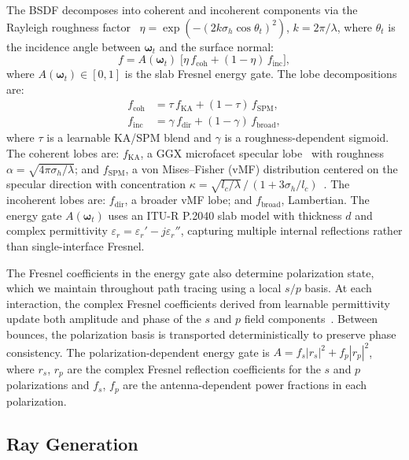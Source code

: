 The BSDF decomposes into coherent and incoherent components via the Rayleigh roughness factor~\cite{beckmann1963scattering} $\eta = \exp(-(2k\sigma_h\cos\theta_t)^2)$, $k=2\pi/\lambda$, where $\theta_t$ is the incidence angle between $\boldsymbol{\omega}_t$ and the surface normal:
\begin{equation}
    f = A(\boldsymbol{\omega}_t)\;\Big[\eta\,f_\mathrm{coh} + (1-\eta)\,f_\mathrm{inc}\Big],
    \label{eq:bsdf_full}
\end{equation}
where $A(\boldsymbol{\omega}_t) \in [0,1]$ is the slab Fresnel energy gate. The lobe decompositions are:
\begin{align}
    f_\mathrm{coh} &= \tau\, f_\mathrm{KA} + (1{-}\tau)\, f_\mathrm{SPM}, \label{eq:bsdf_coh} \\
    f_\mathrm{inc} &= \gamma\, f_\mathrm{dir} + (1{-}\gamma)\, f_\mathrm{broad}, \label{eq:bsdf_inc}
\end{align}
where $\tau$ is a learnable KA/SPM blend and $\gamma$ is a roughness-dependent sigmoid. The coherent lobes are: $f_\mathrm{KA}$, a GGX microfacet specular lobe~\cite{walter2007microfacet} with roughness $\alpha = \sqrt{4\pi\sigma_h/\lambda}$; and $f_\mathrm{SPM}$, a von Mises--Fisher (vMF) distribution centered on the specular direction with concentration $\kappa = \sqrt{l_c/\lambda}\,/\,(1 + 3\sigma_h/l_c)$~\cite{ulaby2019microwave}. The incoherent lobes are: $f_\mathrm{dir}$, a broader vMF lobe; and $f_\mathrm{broad}$, Lambertian. The energy gate $A(\boldsymbol{\omega}_t)$ uses an ITU-R P.2040 slab model with thickness $d$ and complex permittivity $\varepsilon_r = \varepsilon_r' - j\varepsilon_r''$, capturing multiple internal reflections rather than single-interface Fresnel.

The Fresnel coefficients in the energy gate also determine polarization state, which we maintain throughout path tracing using a local $s/p$ basis. At each interaction, the complex Fresnel coefficients derived from learnable permittivity update both amplitude and phase of the $s$ and $p$ field components~\cite{born2013principles}. Between bounces, the polarization basis is transported deterministically to preserve phase consistency. The polarization-dependent energy gate is $A = f_s |r_s|^2 + f_p |r_p|^2$, where $r_s$, $r_p$ are the complex Fresnel reflection coefficients for the $s$ and $p$ polarizations and $f_s$, $f_p$ are the antenna-dependent power fractions in each polarization.

\subsection{Ray Generation}
\label{sec:sampling}

